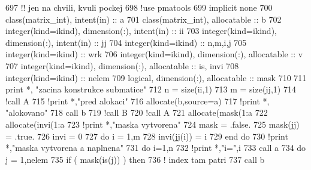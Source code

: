 \begin{DoxyCode}
697     \textcolor{comment}{!! jen na chvili, kvuli pockej
}
698     \textcolor{comment}{!use pmatools
}
699     \textcolor{keywordtype}{implicit none}
700     \textcolor{keywordtype}{class}(matrix\_int), \textcolor{keywordtype}{intent(in)} :: a
701     \textcolor{keywordtype}{class}(matrix\_int), \textcolor{keywordtype}{allocatable} :: b
702     \textcolor{keywordtype}{integer(kind=ikind)}, \textcolor{keywordtype}{dimension(:)}, \textcolor{keywordtype}{intent(in)} :: ii
703     \textcolor{keywordtype}{integer(kind=ikind)}, \textcolor{keywordtype}{dimension(:)}, \textcolor{keywordtype}{intent(in)} :: jj
704     \textcolor{keywordtype}{integer(kind=ikind)} :: n,m,i,j
705     \textcolor{keywordtype}{integer(kind=ikind)} :: wrk
706     \textcolor{keywordtype}{integer(kind=ikind)}, \textcolor{keywordtype}{dimension(:)}, \textcolor{keywordtype}{allocatable} :: v
707     \textcolor{keywordtype}{integer(kind=ikind)}, \textcolor{keywordtype}{dimension(:)}, \textcolor{keywordtype}{allocatable} :: is, invi
708     \textcolor{keywordtype}{integer(kind=ikind)} :: nelem
709     \textcolor{keywordtype}{logical}, \textcolor{keywordtype}{dimension(:)}, \textcolor{keywordtype}{allocatable} :: mask
710 
711     print *, \textcolor{stringliteral}{"zacina konstrukce submatice"}
712     n = \textcolor{keyword}{size}(ii,1)
713     m = \textcolor{keyword}{size}(jj,1)
714     \textcolor{comment}{!call A%
}
715     \textcolor{comment}{!print *,"pred alokaci"
}
716     \textcolor{keyword}{allocate}(b,source=a)
717     \textcolor{comment}{!print *, "alokovano"
}
718     \textcolor{keyword}{call }b%
719     \textcolor{comment}{!call B%
}
720     \textcolor{comment}{!call A%
}
721     \textcolor{keyword}{allocate}(mask(1:a%
722     \textcolor{keyword}{allocate}(invi(1:a%
723     \textcolor{comment}{!print *,"maska vytvorena"
}
724     mask = .false.
725     mask(jj) = .true.
726     invi = 0
727     \textcolor{keywordflow}{do} i = 1,m
728         invi(jj(i)) = i
729 \textcolor{keyword}{    end }do
730     \textcolor{comment}{!print *,"maska vytvorena a naplnena"
}
731     \textcolor{keywordflow}{do} i=1,n
732         \textcolor{comment}{!print *,"i=",i
}
733         \textcolor{keyword}{call }a%
734         \textcolor{keywordflow}{do} j = 1,nelem
735             \textcolor{keywordflow}{if} ( mask(is(j)) ) then
736                 \textcolor{comment}{! index tam patri
}
737                 \textcolor{keyword}{call }b%

\end{DoxyCode}
